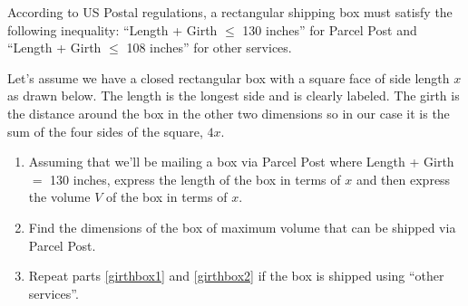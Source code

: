 \documentclass{ximera}
\begin{document}
\begin{problem}
According to US Postal regulations, a rectangular shipping box must satisfy the following inequality: ``Length + Girth $\leq$ 130 inches'' for Parcel Post and ``Length + Girth $\leq$ 108 inches'' for other services. 

Let's assume we have a closed rectangular box with a square face of side length $x$ as drawn below.  The length is the longest side and is clearly labeled.  The girth is the distance around the box in the other two dimensions so in our case it is the sum of the four sides of the square, $4x$. 

\begin{enumerate}

\item \label{girthbox1} Assuming that we'll be mailing a box via Parcel Post where Length + Girth $=$ 130 inches, express the length of the box in terms of $x$ and then express the volume $V$ of the box in terms of $x$.

\item \label{girthbox2} Find the dimensions of the box of maximum volume that can be shipped via Parcel Post.

\item Repeat parts \ref{girthbox1} and \ref{girthbox2} if the box is shipped using ``other services''.

\end{enumerate}

\begin{center}


\end{center}
\end{problem}
\end{document}

